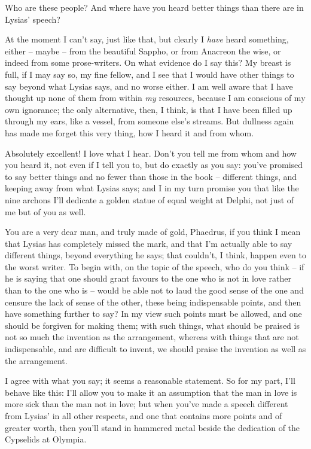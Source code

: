  Who are these people? And where have you heard better
things than there are in Lysias' speech?

At the moment I can't say, just like that, but clearly I
{\em have} heard
something, either --
maybe -- from the beautiful Sappho, or from Anacreon the wise, or indeed
from some 
prose-writers. On what
evidence do I say this? My breast is full, if I may say so, my fine
fellow, and I see that I would have other things to say beyond what
Lysias says, and no worse either. I am well aware that I have thought up
none of them from within {\em my} resources, because I am conscious of
my own ignorance; the only alternative, then, I think, is that I have
been  filled up through my ears, like a vessel, from someone
else's streams. But dullness again has made me forget this very thing,
how I heard it and from whom.

Absolutely
excellent! I love what I
hear. Don't  you tell me from whom and how you heard it, not
even if I tell you to, but do exactly as you say: you've promised to say
better things and no fewer than those in the book -- different things,
and keeping away from what Lysias says; and I in my turn promise you
that like the nine
archons I'll dedicate a
golden statue of equal weight at Delphi, not just of me but of you as
 well.

You are a very dear man, and truly made of gold, Phaedrus, if
you think I mean that Lysias has completely missed the mark, and that
I'm actually able to say different things, beyond everything he says;
that couldn't, I think, happen even  to the worst writer. To
begin with, on the topic of the speech, who do you think -- if he is
saying that one should grant favours to the one who is not in love
rather than to the one who is -- would be able not to laud the good
sense of the one and censure  the lack of sense of the other,
these being indispensable points, and then have something further to
say? In my view such points must be allowed, and one should be forgiven
for making them; with such things, what should be praised is not so much
the invention as the arrangement, whereas with things that are not
indispensable, and are difficult to invent, we should praise the
 invention as well as the arrangement.

I agree with what you say; it seems a reasonable statement. So
for my part, I'll behave like this: I'll allow you to make it an
assumption that the man in love is more sick than  the man not
in love; but when you've made a speech different from Lysias' in all
other respects, and one that contains more points and of greater worth,
then you'll stand in hammered metal beside the dedication of the
Cypselids at Olympia.

